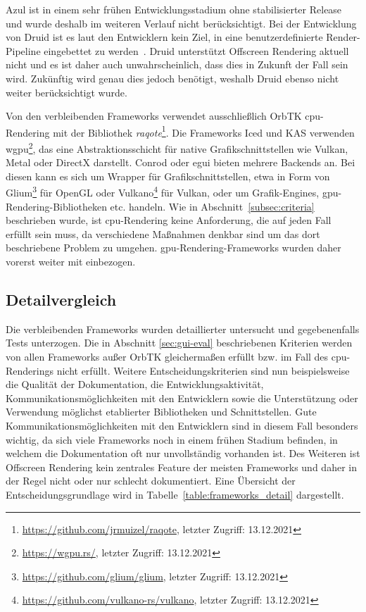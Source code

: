 Azul ist in einem sehr frühen Entwicklungsstadium ohne stabilisierter Release und wurde deshalb im weiteren Verlauf nicht berücksichtigt. Bei der Entwicklung von Druid ist es laut den Entwicklern kein Ziel, in eine benutzerdefinierte Render-Pipeline eingebettet zu werden~\cite{LinebenderDruid2018}. Druid unterstützt Offscreen Rendering aktuell nicht und es ist daher auch unwahrscheinlich, dass dies in Zukunft der Fall sein wird. Zukünftig wird genau dies jedoch benötigt, weshalb Druid ebenso nicht weiter berücksichtigt wurde.

Von den verbleibenden Frameworks verwendet ausschließlich OrbTK \gls{cpu}-Rendering mit der Bibliothek \emph{raqote}\footnote{\url{https://github.com/jrmuizel/raqote}, letzter Zugriff: 13.12.2021}. Die Frameworks Iced und KAS verwenden wgpu\footnote{\url{https://wgpu.rs/}, letzter Zugriff: 13.12.2021}, das eine Abstraktionsschicht für native Grafikschnittstellen wie Vulkan, Metal oder DirectX darstellt. Conrod oder egui bieten mehrere Backends an. Bei diesen kann es sich um Wrapper für Grafikschnittstellen, etwa in Form von Glium\footnote{\url{https://github.com/glium/glium}, letzter Zugriff: 13.12.2021} für OpenGL oder Vulkano\footnote{\url{https://github.com/vulkano-rs/vulkano}, letzter Zugriff: 13.12.2021} für Vulkan, oder um Grafik-Engines, \gls{gpu}-Rendering-Bibliotheken etc. handeln. Wie in Abschnitt~\ref{subsec:criteria} beschrieben wurde, ist \gls{cpu}-Rendering keine Anforderung, die auf jeden Fall erfüllt sein muss, da verschiedene Maßnahmen denkbar sind um das dort beschriebene Problem zu umgehen. \gls{gpu}-Rendering-Frameworks wurden daher vorerst weiter mit einbezogen.




\subsection{Detailvergleich}

Die verbleibenden Frameworks wurden detaillierter untersucht und gegebenenfalls Tests unterzogen. %
Die in Abschnitt \ref{sec:gui-eval} beschriebenen Kriterien werden von allen Frameworks außer OrbTK gleichermaßen erfüllt bzw. im Fall des \gls{cpu}-Renderings nicht erfüllt.
Weitere Entscheidungskriterien sind nun beispielsweise die Qualität der Dokumentation, die Entwicklungsaktivität, Kommunikationsmöglichkeiten mit den Entwicklern sowie die Unterstützung oder Verwendung möglichst etablierter Bibliotheken und Schnittstellen. Gute Kommunikationsmöglichkeiten mit den Entwicklern sind in diesem Fall besonders wichtig, da sich viele Frameworks noch in einem frühen Stadium befinden, in welchem die Dokumentation oft nur unvollständig vorhanden ist. Des Weiteren ist Offscreen Rendering kein zentrales Feature der meisten Frameworks und daher in der Regel nicht oder nur schlecht dokumentiert. Eine Übersicht der Entscheidungsgrundlage wird in Tabelle~\ref{table:frameworks_detail} dargestellt.


